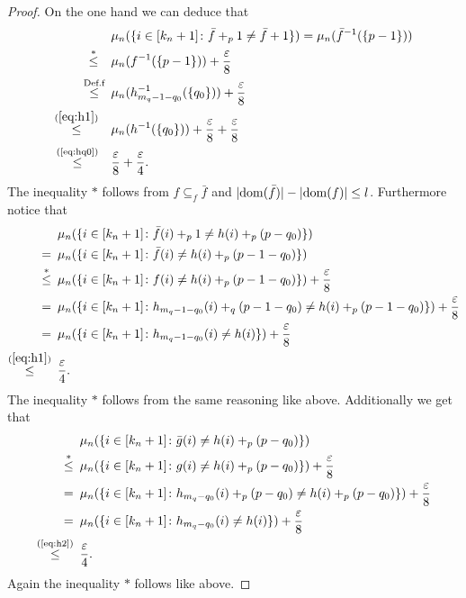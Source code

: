 \begin{proof}
  On the one hand we can deduce that
  \begin{align*}
    &\mu_n(\{i \in [k_n+1]\colon \bar{f} +_p 1 \neq \bar{f} + 1\}) = \mu_n(\bar{f}^{-1}(\{p-1\})) \\
    \overset{*}{\leq} \hspace*{10px} &\mu_n(f^{-1}(\{p-1\})) + {\varepsilon \over 8} \\
    \overset{\text{Def.f}}{\leq} \hspace*{5px} &\mu_n(\h^{-1}(\{q_0\})) + {\varepsilon \over 8} \\
    \overset{(\ref{eq:h1})}{\leq} \hspace*{10px}&\mu_n(h^{-1}(\{q_0\})) + {\varepsilon \over 8} + {\varepsilon \over 8} \\
    \overset{\text{(\ref{eq:hq0})}}{\leq} \hspace*{10px}&{\varepsilon \over 8} + {\varepsilon \over 4}.
  \end{align*}
  The inequality $*$ follows from $f \subseteq_f \bar{f}$ and $|{\rm dom}(\bar{f})| - |{\rm dom}(f)| \leq l$.
  Furthermore notice that
  \begin{align*}
      &\mu_n(\{i \in [k_n+1]\colon \bar{f}(i) +_p 1 \neq h(i) +_p (p-q_0)\}) \\
    = \hspace*{5px} &\mu_n(\{i \in [k_n+1]\colon \bar{f}(i) \neq h(i) +_p (p-1-q_0)\}) \\
    \overset{*}{\leq} \hspace*{5px}&\mu_n(\{i \in [k_n+1]\colon f(i) \neq h(i) +_p (p-1-q_0)\}) + {\varepsilon \over 8} \\
    = \hspace*{5px}&\mu_n(\{i \in [k_n+1]\colon \h(i) +_q (p-1-q_0) \neq h(i) +_p (p-1-q_0)\}) + {\varepsilon \over 8} \\
    = \hspace*{5px}&\mu_n(\{i \in [k_n+1]\colon \h(i) \neq h(i) \}) + {\varepsilon \over 8} \\
    \overset{(\ref{eq:h1})}{\leq} \hspace*{5px}&{\varepsilon \over 4}.
  \end{align*}
  The inequality $*$ follows from the same reasoning like above.
  Additionally we get that
  \begin{align*}
    &\mu_n(\{i\in [k_n+1]\colon \bar{g}(i) \neq h(i) +_p (p-q_0)\}) \\
    \overset{*}{\leq} \hspace*{5px}&\mu_n(\{i\in [k_n+1]\colon g(i) \neq h(i) +_p (p-q_0)\}) + {\varepsilon \over 8} \\
    = \hspace*{5px}&\mu_n(\{i\in [k_n+1]\colon \hh(i) +_p (p-q_0) \neq h(i) +_p (p-q_0)\}) + {\varepsilon \over 8} \\
    = \hspace*{5px}&\mu_n(\{i\in [k_n+1]\colon \hh(i) \neq h(i) \}) + {\varepsilon \over 8} \\
    \overset{\text{(\ref{eq:h2})}}{\leq} \hspace*{5px} &{\varepsilon \over 4}.
  \end{align*} 
  Again the inequality $*$ follows like above.


\end{proof}
